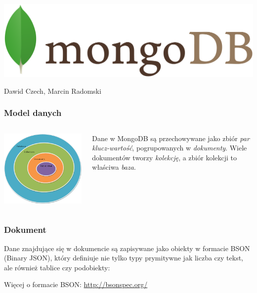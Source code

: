 \documentclass{beamer}
\begin{document}
  \begin{frame}
    \begin{center}
      \includegraphics[width=\textwidth,keepaspectratio]{img/logo.png}

      Dawid Czech, Marcin Radomski
    \end{center}
  \end{frame}

  \begin{frame}
    \frametitle{Model danych}
    \begin{columns}
      \includegraphics[scale=0.5]{img/db-structure.png}

      Dane w MongoDB są przechowywane jako zbiór \emph{par klucz-wartość}, pogrupowanych w \emph{dokumenty}. Wiele dokumentów tworzy \emph{kolekcję}, a zbiór kolekcji to właściwa \emph{baza}.
    \end{columns}
  \end{frame}

  \begin{frame}
    \frametitle{Dokument}
    Dane znajdujące się w dokumencie są zapisywane jako obiekty w formacie BSON (Binary JSON), który definiuje nie tylko typy prymitywne jak liczba czy tekst, ale również tablice czy podobiekty:
    

    Więcej o formacie BSON: \url{http://bsonspec.org/}
  \end{frame}
\end{document}
